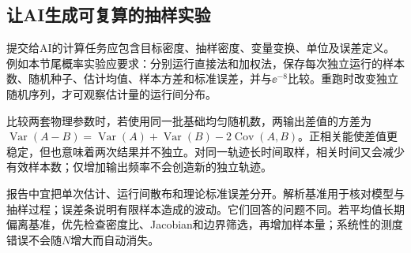 \subsection{让AI生成可复算的抽样实验}
提交给AI的计算任务应包含目标密度、抽样密度、变量变换、单位及误差定义。例如本节尾概率实验应要求：分别运行直接法和加权法，保存每次独立运行的样本数、随机种子、估计均值、样本方差和标准误差，并与$\ee^{-8}$比较。重跑时改变独立随机序列，才可观察估计量的运行间分布。

比较两套物理参数时，若使用同一批基础均匀随机数，两输出差值的方差为$\operatorname{Var}(A-B)=\operatorname{Var}(A)+\operatorname{Var}(B)-2\operatorname{Cov}(A,B)$。正相关能使差值更稳定，但也意味着两次结果并不独立。对同一轨迹长时间取样，相关时间又会减少有效样本数；仅增加输出频率不会创造新的独立轨迹。

报告中宜把单次估计、运行间散布和理论标准误差分开。解析基准用于核对模型与抽样过程；误差条说明有限样本造成的波动。它们回答的问题不同。若平均值长期偏离基准，优先检查密度比、Jacobian和边界筛选，再增加样本量；系统性的测度错误不会随$N$增大而自动消失。
